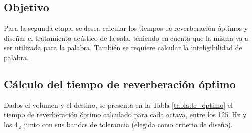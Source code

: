 \subsection{Objetivo}

	Para la segunda etapa, se desea calcular los tiempos de reverberación óptimos y diseñar el tratamiento acústico de la sala, teniendo en cuenta que la misma va a ser utilizada para la palabra. También se requiere calcular la inteligibilidad de palabra.


\subsection{Cálculo del tiempo de reverberación óptimo}

	Dados el volumen y el destino, se presenta en la Tabla \ref{tabla:tr_óptimo} el tiempo de reverberación óptimo calculado para cada  octava, entre los \SI{125}{\Hz} y los \SI{4}{\k\Hz}, junto con sus bandas de tolerancia (elegida como criterio de diseño).
	
		\begin{table}[h!]
			\centering
			\caption{Tiempo de reverberación óptimo calculado, junto con sus respectivas bandas de tolerancia, en función de la frecuencia.}
			\label{tabla:tr_óptimo}
		\end{table}
	
